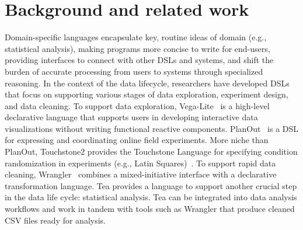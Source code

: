 \section{Background and related work} \label{sec:relatedWorkTea}
Domain-specific languages encapsulate key, routine ideas of domain (e.g.,
statistical analysis), making programs more concise to write for end-users,
providing interfaces to connect with other DSLs and systems, and shift the
burden of accurate processing from users to systems through specialized
reasoning. In the context of the data lifecycle, researchers have developed DSLs
that focus on supporting various stages of data exploration, experiment design,
and data cleaning. To support data exploration,
Vega-Lite~\cite{satyanarayan2017vega} is a high-level declarative language that
supports users in developing interactive data visualizations without writing
functional reactive components. PlanOut~\cite{bakshy2014planout} is a DSL for
expressing and coordinating online field experiments. More niche than PlanOut,
Touchstone2 provides the Touchstone Language for specifying condition
randomization in experiments (e.g., Latin
Squares)~\cite{eiselmayer2019touchstone2}.%
To support rapid data cleaning,  Wrangler~\cite{kandel2011wrangler} combines a
mixed-initiative interface with a declarative transformation language. Tea
provides a language to support another crucial step in the data life cycle:
statistical analysis. Tea can be integrated into data analysis workflows and
work in tandem with tools such as Wrangler that produce cleaned CSV files ready
for analysis.


